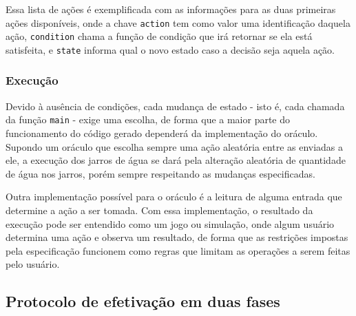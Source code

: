 Essa lista de ações é exemplificada com as informações para as duas primeiras
ações disponíveis, onde a chave \texttt{action} tem como valor uma identificação
daquela ação, \texttt{condition} chama a função de condição que irá retornar se
ela está satisfeita, e \texttt{state} informa qual o novo estado caso a decisão
seja aquela ação.

\subsubsection{Execução}

Devido à ausência de condições, cada mudança de estado - isto é, cada chamada da
função \texttt{main} - exige uma escolha, de forma que a maior parte do
funcionamento do código gerado dependerá da implementação do oráculo. Supondo um
oráculo que escolha sempre uma ação aleatória entre as enviadas a ele, a
execução dos jarros de água se dará pela alteração aleatória de quantidade de
água nos jarros, porém sempre respeitando as mudanças especificadas.

Outra implementação possível para o oráculo é a leitura de alguma entrada que
determine a ação a ser tomada. Com essa implementação, o resultado da execução
pode ser entendido como um jogo ou simulação, onde algum usuário determina uma
ação e observa um resultado, de forma que as restrições impostas pela
especificação funcionem como regras que limitam as operações a serem feitas pelo
usuário.

\subsection{Protocolo de efetivação em duas fases}





